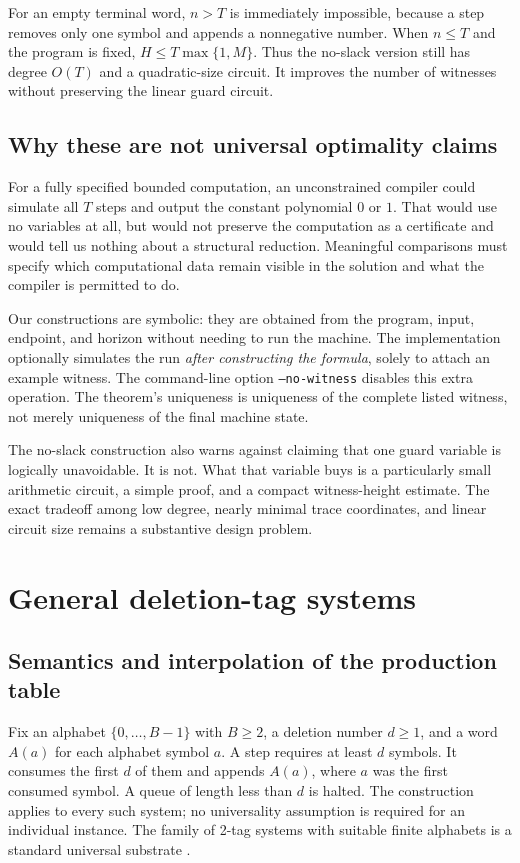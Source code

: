 \documentclass[11pt,a4paper]{article}
\theoremstyle{definition}
\theoremstyle{remark}
\newcommand{\srctag}[1]{\texorpdfstring{\hspace{0.5em}{\normalfont\small\color{accent}[#1]}}{ [#1]}}
\begin{document}
For an empty terminal word, $n>T$ is immediately impossible, because a step removes only one symbol and appends a nonnegative number. When $n\leq T$ and the program is fixed, $H\leq T\max\{1,M\}$. Thus the no-slack version still has degree $O(T)$ and a quadratic-size circuit. It improves the number of witnesses without preserving the linear guard circuit.

\subsection{Why these are not universal optimality claims}
For a fully specified bounded computation, an unconstrained compiler could simulate all $T$ steps and output the constant polynomial $0$ or $1$. That would use no variables at all, but would not preserve the computation as a certificate and would tell us nothing about a structural reduction. Meaningful comparisons must specify which computational data remain visible in the solution and what the compiler is permitted to do.

Our constructions are symbolic: they are obtained from the program, input, endpoint, and horizon without needing to run the machine. The implementation optionally simulates the run \emph{after constructing the formula}, solely to attach an example witness. The command-line option \texttt{--no-witness} disables this extra operation. The theorem's uniqueness is uniqueness of the complete listed witness, not merely uniqueness of the final machine state.

The no-slack construction also warns against claiming that one guard variable is logically unavoidable. It is not. What that variable buys is a particularly small arithmetic circuit, a simple proof, and a compact witness-height estimate. The exact tradeoff among low degree, nearly minimal trace coordinates, and linear circuit size remains a substantive design problem.

\section{General deletion-tag systems\srctag{07}}\label{cdc:qc:sec:general-tag}
\subsection{Semantics and interpolation of the production table}
Fix an alphabet $\{0,\ldots,B-1\}$ with $B\geq2$, a deletion number $d\geq1$, and a word $A(a)$ for each alphabet symbol $a$. A step requires at least $d$ symbols. It consumes the first $d$ of them and appends $A(a)$, where $a$ was the first consumed symbol. A queue of length less than $d$ is halted. The construction applies to every such system; no universality assumption is required for an individual instance. The family of 2-tag systems with suitable finite alphabets is a standard universal substrate \cite{cook,woods-neary}.
\end{document}

